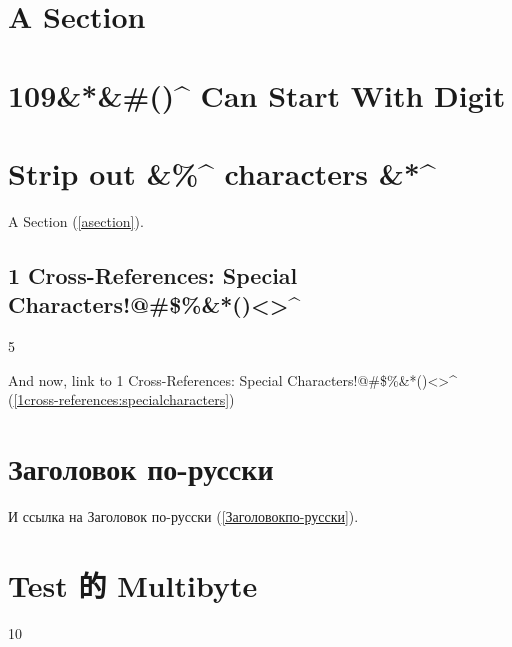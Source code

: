 
\def\mytitle{Cross-References}


\part{A Section }
\label{asection}

\part{109\&*\&\#()\^{} Can Start With Digit }
\label{109canstartwithdigit}

\part{Strip out \&\%\^{} characters \&*\^{} }
\label{stripoutcharacters}

A Section (\autoref{asection}).

\chapter{1 Cross-References: Special Characters!@\#\$\%\&*()<>\^{} }
\label{1cross-references:specialcharacters}

5

And now, link to 1 Cross-References: Special Characters!@\#\$\%\&*()<>\^{} (\autoref{1cross-references:specialcharacters})

\part{Заголовок по-русски }
\label{Заголовокпо-русски}

И ссылка на Заголовок по-русски (\autoref{Заголовокпо-русски}).

\part{Test 的 Multibyte }
\label{test的multibyte}

10



